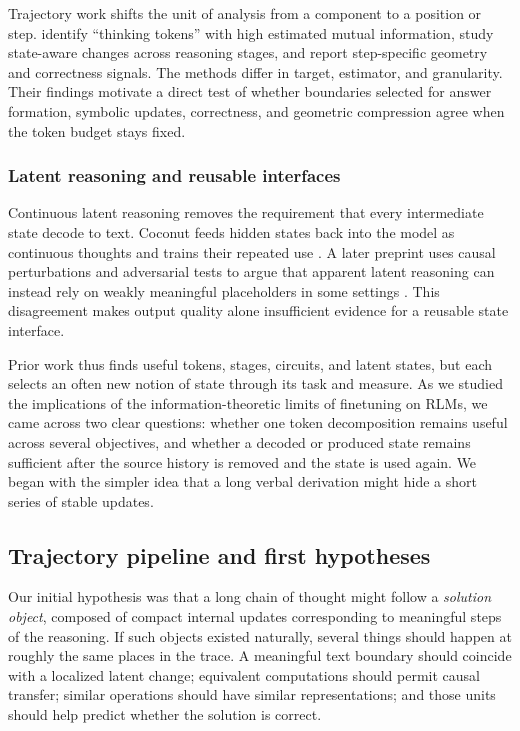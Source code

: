 Trajectory work shifts the unit of analysis from a component to a position or step. \Textcite{qian2025peaks} identify ``thinking tokens'' with high estimated mutual information, \textcite{yu2025stateaware} study state-aware changes across reasoning stages, and \textcite{sun2026trajectories} report step-specific geometry and correctness signals. The methods differ in target, estimator, and granularity. Their findings motivate a direct test of whether boundaries selected for answer formation, symbolic updates, correctness, and geometric compression agree when the token budget stays fixed.

\subsubsection{Latent reasoning and reusable interfaces}

Continuous latent reasoning removes the requirement that every intermediate state decode to text. Coconut feeds hidden states back into the model as continuous thoughts and trains their repeated use \parencite{hao2025coconut}. A later preprint uses causal perturbations and adversarial tests to argue that apparent latent reasoning can instead rely on weakly meaningful placeholders in some settings \parencite{zhang2025latenttokens}. This disagreement makes output quality alone insufficient evidence for a reusable state interface.

Prior work thus finds useful tokens, stages, circuits, and latent states, but each selects an often new notion of state through its task and measure. As we studied the implications of the information-theoretic limits of finetuning on RLMs, we came across two clear questions: whether one token decomposition remains useful across several objectives, and whether a decoded or produced state remains sufficient after the source history is removed and the state is used again. We began with the simpler idea that a long verbal derivation might hide a short series of stable updates.

\FloatBarrier
\subsection{Trajectory pipeline and first hypotheses}

Our initial hypothesis was that a long chain of thought might follow a \emph{solution object}, composed of compact internal updates corresponding to meaningful steps of the reasoning. If such objects existed naturally, several things should happen at roughly the same places in the trace. A meaningful text boundary should coincide with a localized latent change; equivalent computations should permit causal transfer; similar operations should have similar representations; and those units should help predict whether the solution is correct.

